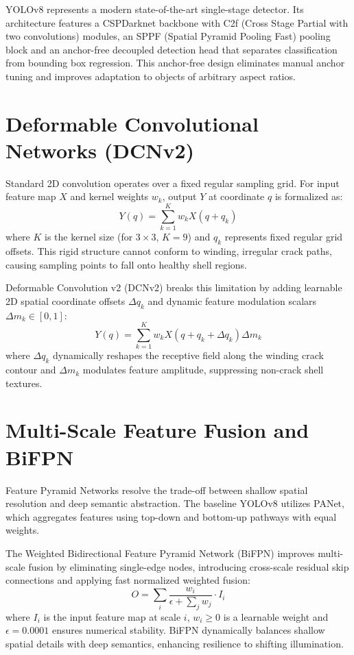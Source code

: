 \documentclass[12pt,a4paper]{report}
\begin{document}
YOLOv8 represents a modern state-of-the-art single-stage detector. Its architecture features a CSPDarknet backbone with C2f (Cross Stage Partial with two convolutions) modules, an SPPF (Spatial Pyramid Pooling Fast) pooling block and an anchor-free decoupled detection head that separates classification from bounding box regression. This anchor-free design eliminates manual anchor tuning and improves adaptation to objects of arbitrary aspect ratios.

\section{Deformable Convolutional Networks (DCNv2)}

Standard 2D convolution operates over a fixed regular sampling grid. For input feature map $X$ and kernel weights $w_k$, output $Y$ at coordinate $q$ is formalized as:
\begin{equation}
Y(q) = \sum_{k=1}^{K} w_k X(q + q_k)
\end{equation}
where $K$ is the kernel size (for $3 \times 3$, $K=9$) and $q_k$ represents fixed regular grid offsets. This rigid structure cannot conform to winding, irregular crack paths, causing sampling points to fall onto healthy shell regions.

Deformable Convolution v2 (DCNv2) breaks this limitation by adding learnable 2D spatial coordinate offsets $\Delta q_k$ and dynamic feature modulation scalars $\Delta m_k \in [0, 1]$:
\begin{equation}
Y(q) = \sum_{k=1}^{K} w_k X(q + q_k + \Delta q_k) \Delta m_k
\end{equation}
where $\Delta q_k$ dynamically reshapes the receptive field along the winding crack contour and $\Delta m_k$ modulates feature amplitude, suppressing non-crack shell textures.

\section{Multi-Scale Feature Fusion and BiFPN}

Feature Pyramid Networks resolve the trade-off between shallow spatial resolution and deep semantic abstraction. The baseline YOLOv8 utilizes PANet, which aggregates features using top-down and bottom-up pathways with equal weights.

The Weighted Bidirectional Feature Pyramid Network (BiFPN) improves multi-scale fusion by eliminating single-edge nodes, introducing cross-scale residual skip connections and applying fast normalized weighted fusion:
\begin{equation}
O = \sum_{i} \frac{w_i}{\epsilon + \sum_{j} w_j} \cdot I_i
\end{equation}
where $I_i$ is the input feature map at scale $i$, $w_i \ge 0$ is a learnable weight and $\epsilon = 0.0001$ ensures numerical stability. BiFPN dynamically balances shallow spatial details with deep semantics, enhancing resilience to shifting illumination.
\end{document}
